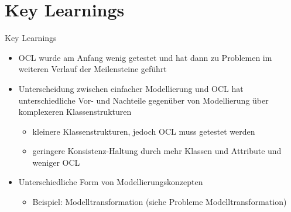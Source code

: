 \section{Key Learnings}
\begin{frame}{Key Learnings}
	\begin{itemize}
		\item OCL wurde am Anfang wenig getestet und hat dann zu Problemen im weiteren Verlauf der Meilensteine geführt
		\item Unterscheidung zwischen einfacher Modellierung und OCL hat unterschiedliche Vor- und Nachteile gegenüber von Modellierung über komplexeren Klassenstrukturen
		\begin{itemize}
			\item kleinere Klassenstrukturen, jedoch OCL muss getestet werden
			\item geringere Konsistenz-Haltung durch mehr Klassen und Attribute und weniger OCL
		\end{itemize}
		\item Unterschiedliche Form von Modellierungskonzepten
		\begin{itemize}
			\item Beispiel: Modelltransformation (siehe Probleme Modelltransformation)
		\end{itemize}
	\end{itemize}
\end{frame}